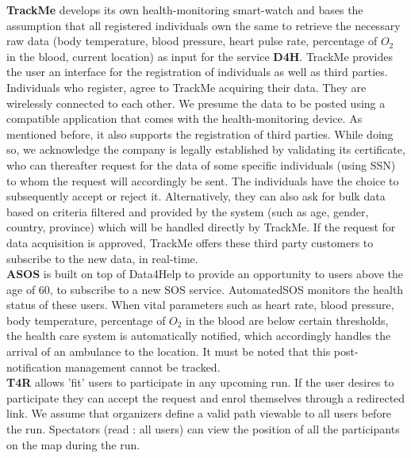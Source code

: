 \documentclass[12pt]{report}
\begin{document}
\textbf{TrackMe} develops its own health-monitoring smart-watch and bases the assumption that all registered individuals own the same to retrieve the necessary raw data (body temperature, blood pressure, heart pulse rate, percentage of $O_2$ in the blood, current location)  as input for the service \textbf{D4H}. TrackMe provides the user an interface for the registration of individuals as well as third parties. Individuals who register, agree to TrackMe acquiring their data. They are wirelessly connected to each other. We presume the data to be posted using a compatible application that comes with the health-monitoring device. As mentioned before, it also supports the registration of third parties. While doing so, we acknowledge the company is legally established by validating its certificate, who can thereafter request for the data of some specific individuals (using SSN) to whom the request will accordingly be sent. The individuals have the choice to subsequently accept or reject it. Alternatively, they can also ask for bulk data based on criteria filtered and provided by the system (such as age, gender, country, province) which will be handled directly by TrackMe. If the request for data acquisition is approved, TrackMe offers these third party customers to subscribe to the new data, in real-time.\\

\textbf{ASOS} is built on top of Data4Help to provide an opportunity to users above the age of 60, to subscribe to a new SOS service. AutomatedSOS monitors the health status of these users. When vital parameters  such as heart rate, blood pressure, body temperature, percentage of $O_2$ in the blood are below certain thresholds, the health care system is automatically notified, which accordingly handles the arrival of an ambulance to the location. It must be noted that this post-notification management cannot be tracked.\\

\textbf{T4R} allows 'fit' users to participate in any upcoming run. If the user desires to participate they can accept the request and enrol themselves through a redirected link.  We assume that organizers define a valid path viewable to all users before the run. Spectators (read : all users) can view the position of all the participants on the map during the run. \\
\end{document}
